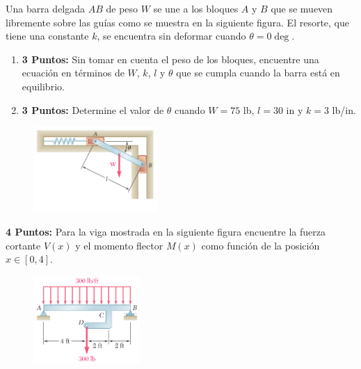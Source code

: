 \documentclass[ a4paper, twoside, 11pt]{article}
\begin{document}
\begin{problem}
Una barra delgada $AB$ de peso $W$ se une a los bloques $A$ y $B$ que se mueven libremente sobre las gu\'ias como se muestra en la siguiente figura. El resorte, que tiene una constante $k$, se encuentra sin deformar cuando $\theta = 0\deg$. 
\begin{enumerate}[label=\textbf{\alph*)}]
\item \textbf{3 Puntos:} Sin tomar en cuenta el peso de los bloques, encuentre una ecuaci\'on en t\'erminos de $W$, $k$, $l$ y $\theta$ que se cumpla cuando la barra est\'a en equilibrio. 
\item \textbf{3 Puntos:} Determine el valor de $\theta$ cuando $W = 75$ lb, $l = 30$ in y $k = 3$ lb/in. 
\end{enumerate}

\begin{figure}[htb]
\centering
\includegraphics[width=0.42\textwidth]{prob-equilibrio.jpg}
\end{figure}

\end{problem}
\fullskip

\begin{problem}
\textbf{4 Puntos:} Para la viga mostrada en la siguiente figura encuentre la fuerza cortante $V(x)$ y el momento flector $M(x)$ como funci\'on de la posici\'on $x \in [0,4]$. 

\begin{figure}[htb]
\centering
\includegraphics[width=0.36\textwidth]{prob-vigas.jpg}
\end{figure}

\end{problem}
\fullskip
\end{document}
